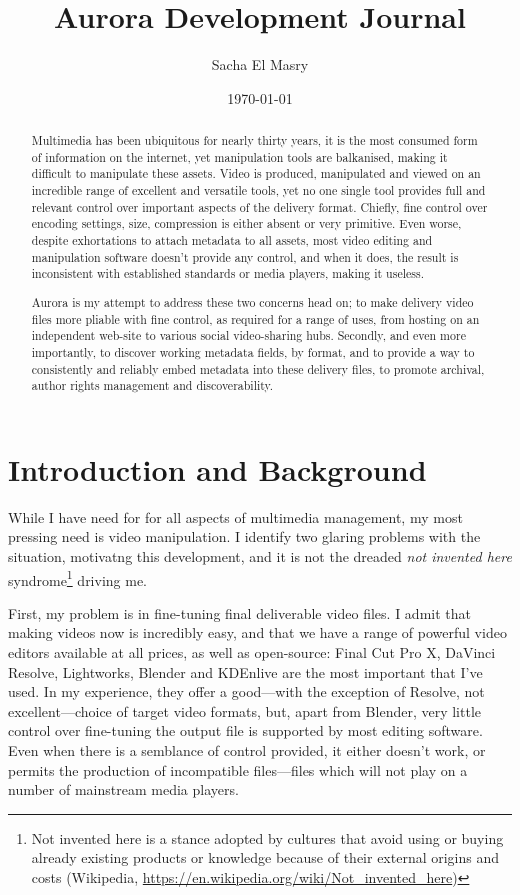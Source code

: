 \documentclass{article}
\title{}
\author{Sacha El Masry}
\date{\today}
\title{Aurora Development Journal}
\begin{document}
\maketitle
\tableofcontents

\begin{abstract}
Multimedia has been ubiquitous for nearly thirty years, it is the most consumed
form of information on the internet, yet manipulation tools are balkanised,
making it difficult to manipulate these assets. Video is produced, manipulated
and viewed on an incredible range of excellent and versatile tools, yet no one
single tool provides full and relevant control over important aspects of the
delivery format. Chiefly, fine control over encoding settings, size, compression
is either absent or very primitive. Even worse, despite exhortations to attach
metadata to all assets, most video editing and manipulation software doesn't
provide any control, and when it does, the result is inconsistent with
established standards or media players, making it useless.

Aurora is my attempt to address these two concerns head on; to make delivery
video files more pliable with fine control, as required for a range of uses,
from hosting on an independent web-site to various social video-sharing hubs.
Secondly, and even more importantly, to discover working metadata fields, by
format, and to provide a way to consistently and reliably embed metadata into
these delivery files, to promote archival, author rights management and
discoverability.
\end{abstract}

\section{Introduction and Background}
\label{sec:orgfd2a3cc}

While I have need for for all aspects of multimedia management, my most pressing
need is video manipulation. I identify two glaring problems with the situation,
motivatng this development, and it is not the dreaded \emph{not invented here}
syndrome\footnote{Not invented here is a stance adopted by cultures that avoid using or
buying already existing products or knowledge because of their external origins
and costs (Wikipedia, \href{https://en.wikipedia.org/wiki/Not\_invented\_here}{\url{https://en.wikipedia.org/wiki/Not\_invented\_here}})} driving me.

First, my problem is in fine-tuning final deliverable video files. I admit that
making videos now is incredibly easy, and that we have a range of powerful video
editors available at all prices, as well as open-source: Final Cut Pro X,
DaVinci Resolve, Lightworks, Blender and KDEnlive are the most important that
I've used. In my experience, they offer a good---with the exception of Resolve,
not excellent---choice of target video formats, but, apart from Blender, very
little control over fine-tuning the output file is supported by most editing
software. Even when there is a semblance of control provided, it either doesn't
work, or permits the production of incompatible files---files which will not
play on a number of mainstream media players.
\end{document}
